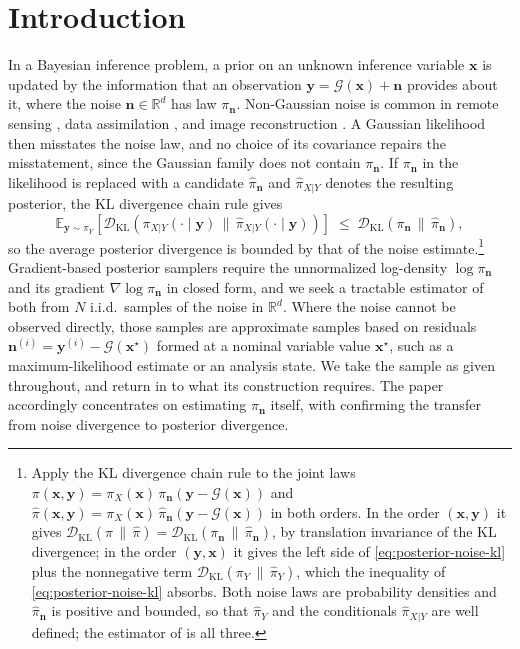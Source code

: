 \documentclass[review,hidelinks,onefignum,onetabnum]{siamart251216}
\newcommand{\RR}{\mathbb{R}}
\newcommand{\EE}{\mathbb{E}}
\newcommand{\DKL}{\mathcal{D}_{\mathrm{KL}}}
\newcommand{\vn}{\bm{n}}
\newcommand{\vx}{\bm{x}}
\newcommand{\vy}{\bm{y}}
\begin{document}
\section{Introduction}
\label{sec:intro}

In a Bayesian inference problem, a prior on an unknown inference variable $\vx$ is updated by the information that an observation $\vy = \mathcal{G}(\vx) + \vn$ provides about it, where the noise $\vn \in \RR^d$ has law $\pi_{\vn}$. Non-Gaussian noise is common in remote sensing \cite{BormannBauerGeer2011}, data assimilation \cite{JanjicBormannBocquet2018survey, HuVanLeeuwenGeer2024, FowlerVanLeeuwen2013}, and image reconstruction \cite{KaipioSomersaloBook}. A Gaussian likelihood then misstates the noise law, and no choice of its covariance repairs the misstatement, since the Gaussian family does not contain $\pi_{\vn}$. If $\pi_{\vn}$ in the likelihood is replaced with a candidate $\widehat\pi_{\vn}$ and $\widehat\pi_{X|Y}$ denotes the resulting posterior, the KL divergence chain rule gives
\begin{equation}
  \EE_{\vy\sim \pi_Y}\!\left[\DKL\!\left(\pi_{X|Y}(\cdot\mid\vy) \,\big\|\, \widehat\pi_{X|Y}(\cdot\mid\vy)\right)\right]
  \;\le\; \DKL(\pi_{\vn}\,\|\,\widehat\pi_{\vn}),
  \label{eq:posterior-noise-kl}
\end{equation}
so the average posterior divergence is bounded by that of the noise estimate.\footnote{Apply the KL divergence chain rule to the joint laws $\pi(\vx,\vy) = \pi_X(\vx)\,\pi_{\vn}(\vy - \mathcal G(\vx))$ and $\widehat\pi(\vx,\vy) = \pi_X(\vx)\,\widehat\pi_{\vn}(\vy - \mathcal G(\vx))$ in both orders. In the order $(\vx,\vy)$ it gives $\DKL(\pi\,\|\,\widehat\pi) = \DKL(\pi_{\vn}\,\|\,\widehat\pi_{\vn})$, by translation invariance of the KL divergence; in the order $(\vy,\vx)$ it gives the left side of \eqref{eq:posterior-noise-kl} plus the nonnegative term $\DKL(\pi_Y\,\|\,\widehat\pi_Y)$, which the inequality of \eqref{eq:posterior-noise-kl} absorbs. Both noise laws are probability densities and $\widehat\pi_{\vn}$ is positive and bounded, so that $\widehat\pi_Y$ and the conditionals $\widehat\pi_{X|Y}$ are well defined; the estimator of  is all three.} Gradient-based posterior samplers \cite{RobertsTweedie1996, Neal2011HMC, CotterRobertsStuartWhite2013} require the unnormalized log-density $\log\pi_{\vn}$ and its gradient $\nabla\log\pi_{\vn}$ in closed form, and we seek a tractable estimator of both from $N$ i.i.d.\ samples of the noise in $\RR^d$. Where the noise cannot be observed directly, those samples are approximate samples based on residuals $\vn^{(i)} = \vy^{(i)} - \mathcal G(\vx^\star)$ formed at a nominal variable value $\vx^\star$, such as a maximum-likelihood estimate or an analysis state. We take the sample as given throughout, and return in  to what its construction requires. The paper accordingly concentrates on estimating $\pi_{\vn}$ itself, with  confirming the transfer from noise divergence to posterior divergence.
\end{document}
